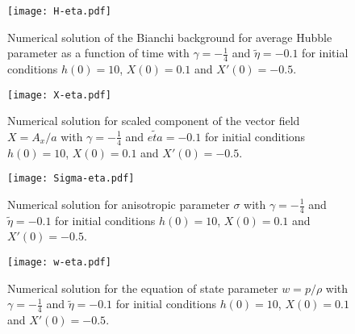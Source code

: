 \documentclass[%
 reprint,
 amsmath,amssymb,
 aps,
]{revtex4-1}
\begin{document}
\begin{figure}
\texttt{[image: H-eta.pdf]}
\caption{\label{BiaSolFig1}\small Numerical solution of the Bianchi background for average Hubble parameter as a function of time with $\gamma=-\frac{1}{4}$ and $\tilde{\eta}=-0.1$ for initial conditions $h(0)=10$, $X(0)=0.1$ and $X'(0)=-0.5$.}
\end{figure}
\begin{figure}
\texttt{[image: X-eta.pdf]}
\caption{\label{BiaSolFig2}\small Numerical solution for scaled component of the vector field $X=A_x/a$ with $\gamma=-\frac{1}{4}$ and $\tilde{eta}=-0.1$ for initial conditions $h(0)=10$, $X(0)=0.1$ and $X'(0)=-0.5$.}
\end{figure}
\begin{figure}
\texttt{[image: Sigma-eta.pdf]}
\caption{\label{BiaSolFig3}Numerical solution for anisotropic parameter $\sigma$ with $\gamma=-\frac{1}{4}$ and $\tilde{\eta}=-0.1$ for initial conditions $h(0)=10$, $X(0)=0.1$ and $X'(0)=-0.5$.}
\end{figure}
\begin{figure}
\texttt{[image: w-eta.pdf]}
\caption{\label{BiaSolFig4}Numerical solution for the equation of state parameter $w=p/\rho$ with $\gamma=-\frac{1}{4}$ and $\tilde{\eta}=-0.1$ for initial conditions $h(0)=10$, $X(0)=0.1$and $X'(0)=-0.5$.}
\end{figure}
\end{document}
